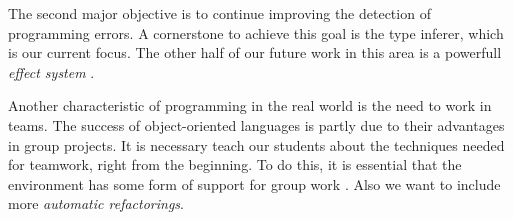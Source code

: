 The second major objective is to continue improving the detection of programming errors.
A cornerstone to achieve this goal is the type inferer, which is our current focus.
The other half of our future work in this area is a powerfull \emph{effect system} \cite{effect system}.

Another characteristic of programming in the real world is the need to work in teams. 
The success of object-oriented languages is partly due to their advantages in group projects. 
It is necessary teach our students about the techniques needed for teamwork, right from the beginning. 
To do this, it is essential that the environment has some form of support for group work \cite{kolling_problem_1999}.
Also we want to include more \emph{automatic refactorings}.

% 
% 
% 
% 



